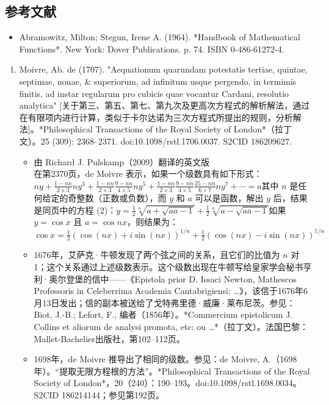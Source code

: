 \subsection{参考文献}    
\begin{itemize}
\item Abramowitz, Milton; Stegun, Irene A. (1964). *Handbook of Mathematical Functions*. New York: Dover Publications. p. 74. ISBN 0-486-61272-4.  
\end{itemize}
\begin{enumerate}
\item Moivre, Ab. de (1707). "Aequationum quarundam potestatis tertiae, quintae, septimae, nonae, & superiorum, ad infinitum usque pergendo, in termimis finitis, ad instar regularum pro cubicis quae vocantur Cardani, resolutio analytica" [关于第三、第五、第七、第九次及更高次方程式的解析解法，通过在有限项内进行计算，类似于卡尔达诺为三次方程式所提出的规则，分析解法]。*Philosophical Transactions of the Royal Society of London*（拉丁文）。25 (309): 2368–2371. doi:10.1098/rstl.1706.0037. S2CID 186209627.
\begin{itemize}
\item 由 Richard J. Pulskamp（2009）翻译的英文版\\  
在第2370页，de Moivre 表示，如果一个级数具有如下形式：\(ny + \frac{1-nn}{2 \times 3} ny^3 + \frac{1-nn}{2 \times 3} \frac{9-nn}{4 \times 5} ny^5 + \frac{1-nn}{2 \times 3} \frac{9-nn}{4 \times 5} \frac{25-nn}{6 \times 7} ny^7 + \cdots = a\)其中 \( n \) 是任何给定的奇整数（正数或负数），而 \( y \) 和 \( a \) 可以是函数，解出 \( y \) 后，结果是同页中的方程 (2)：\(y = \frac{1}{2} \sqrt[n]{a + \sqrt{aa - 1}} + \frac{1}{2} \sqrt[n]{a - \sqrt{aa - 1}}\)如果 \( y = \cos x \) 且 \( a = \cos nx \)，则结果为：\(\cos x = \frac{1}{2} (\cos(nx) + i \sin(nx))^{1/n} + \frac{1}{2} (\cos(nx) - i \sin(nx))^{1/n}\)
\item 1676年，艾萨克·牛顿发现了两个弦之间的关系，且它们的比值为 \( n \) 对 1；这个关系通过上述级数表示。这个级数出现在牛顿写给皇家学会秘书亨利·奥尔登堡的信中——《Epistola prior D. Issaci Newton, Mathescos Professoris in Celeberrima Academia Cantabrigiensi; …》，该信于1676年6月13日发出；信的副本被送给了戈特弗里德·威廉·莱布尼茨。参见：Biot, J.-B.; Lefort, F., 编者（1856年）。*Commercium epistolicum J. Collins et aliorum de analysi promota, etc: ou …*（拉丁文）。法国巴黎：Mallet-Bachelier出版社，第102–112页。
\item 1698年，de Moivre 推导出了相同的级数。参见：de Moivre, A.（1698年）。“提取无限方程根的方法”。*Philosophical Transactions of the Royal Society of London*，20（240）：190–193。doi:10.1098/rstl.1698.0034。S2CID 186214144；参见第192页。

\end{itemize}
\end{enumerate}
